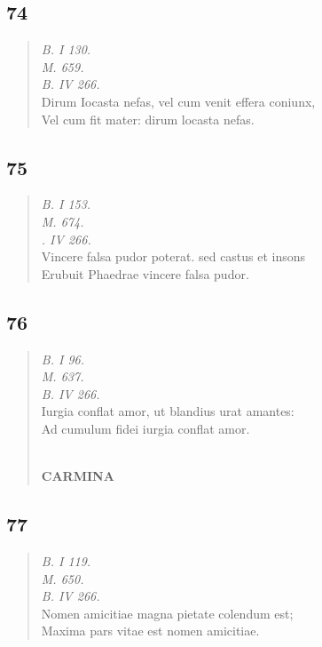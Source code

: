 \documentclass[11pt, a4paper]{report}
\begin{document}
            \subsection*{74}
      \begin{verse}
      \textit{B. I 130.} \\ \textit{M. 659.} \\ \textit{B. IV 266.} \\ Dirum Iocasta nefas, vel cum venit effera coniunx, \\ Vel cum fit mater: dirum locasta nefas. \\ 
      \end{verse}
  
            \subsection*{75}
      \begin{verse}
      \textit{B. I 153.} \\ \textit{M. 674.} \\ \textit{. IV 266.} \\ Vincere falsa pudor poterat. sed castus et insons \\ Erubuit Phaedrae vincere falsa pudor. \\ 
      \end{verse}
  
            \subsection*{76}
      \begin{verse}
      \textit{B. I 96.} \\ \textit{M. 637.} \\ \textit{B. IV 266.} \\ Iurgia conflat amor, ut blandius urat amantes: \\ Ad cumulum fidei iurgia conflat amor. \\ 
        ﻿\pagebreak 
    \begin{center} \textbf{CARMINA} \end{center} \marginpar{[110]} 
      \end{verse}
  
            \subsection*{77}
      \begin{verse}
      \textit{B. I 119.} \\ \textit{M. 650.} \\ \textit{B. IV 266.} \\ Nomen amicitiae magna pietate colendum est; \\ Maxima pars vitae est nomen amicitiae. \\ 
      \end{verse}
  
\end{document}
